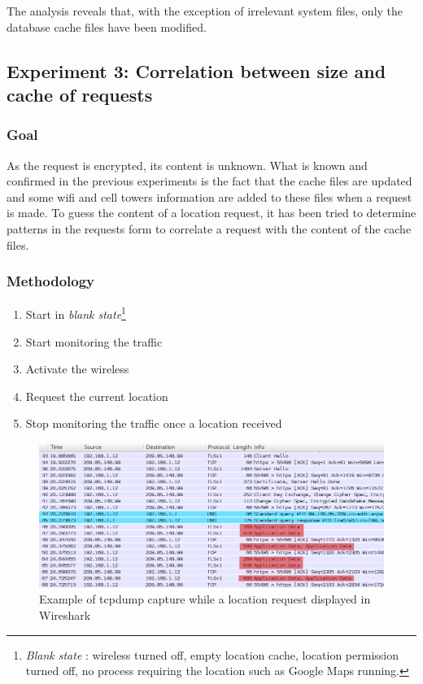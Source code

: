 The analysis reveals that, with the exception of irrelevant system files, only the database cache files have been modified.\\

\subsection{Experiment 3: Correlation between size and cache of requests}

\subsubsection{Goal}

As the request is encrypted, its content is unknown.
What is known and confirmed in the previous experiments is the fact that the cache files are updated and some wifi and cell towers information are added to these files when a request is made.
To guess the content of a location request, it has been tried to determine patterns in the requests form to correlate a request with the content of the cache files.

\subsubsection{Methodology}

\begin{enumerate}
\item Start in \emph{blank state}\footnote{\emph{Blank state} : wireless turned off, empty location cache, location permission turned off, no process requiring the location such as Google Maps running.}
\item Start monitoring the traffic
\item Activate the wireless
\item Request the current location
\item Stop monitoring the traffic once a location received
\end{enumerate}

\begin{figure}[h]
  \centering
  \includegraphics[width=\textwidth]{images/trace2.png}
  \caption{Example of tcpdump capture while a location request displayed in Wireshark}
  \label{fig:loc-req-tcpdump}
\end{figure}

